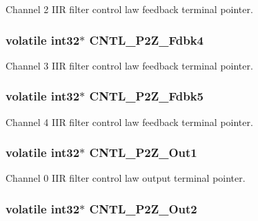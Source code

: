 Channel 2 I\-I\-R filter control law feedback terminal pointer. \hypertarget{a00009_a6937e965f3ae840ea6ee43cce410680f}{
\subsubsection[{C\-N\-T\-L\-\_\-2\-P2\-Z\-\_\-\-Fdbk4}]{\setlength{\rightskip}{0pt plus 5cm}volatile int32$\ast$ C\-N\-T\-L\-\_\-P2\-Z\-\_\-\-Fdbk4}}\label{a00009_a6937e965f3ae840ea6ee43cce410680f}
Channel 3 I\-I\-R filter control law feedback terminal pointer. \hypertarget{a00009_af5cbb635f31bbebd041e8543deb40dee}{
\subsubsection[{C\-N\-T\-L\-\_\-2\-P2\-Z\-\_\-\-Fdbk5}]{\setlength{\rightskip}{0pt plus 5cm}volatile int32$\ast$ C\-N\-T\-L\-\_\-P2\-Z\-\_\-\-Fdbk5}}\label{a00009_af5cbb635f31bbebd041e8543deb40dee}
Channel 4 I\-I\-R filter control law feedback terminal pointer. \hypertarget{a00009_a84d7c096ca668d1edc5e4fa54abe5d98}{
\subsubsection[{C\-N\-T\-L\-\_\-2\-P2\-Z\-\_\-\-Out1}]{\setlength{\rightskip}{0pt plus 5cm}volatile int32$\ast$ C\-N\-T\-L\-\_\-P2\-Z\-\_\-\-Out1}}\label{a00009_a84d7c096ca668d1edc5e4fa54abe5d98}
Channel 0 I\-I\-R filter control law output terminal pointer. \hypertarget{a00009_ae6679b66ffeca93742f973a2c947855f}{
\subsubsection[{C\-N\-T\-L\-\_\-2\-P2\-Z\-\_\-\-Out2}]{\setlength{\rightskip}{0pt plus 5cm}volatile int32$\ast$ C\-N\-T\-L\-\_\-P2\-Z\-\_\-\-Out2}}\label{a00009_ae6679b66ffeca93742f973a2c947855f}
